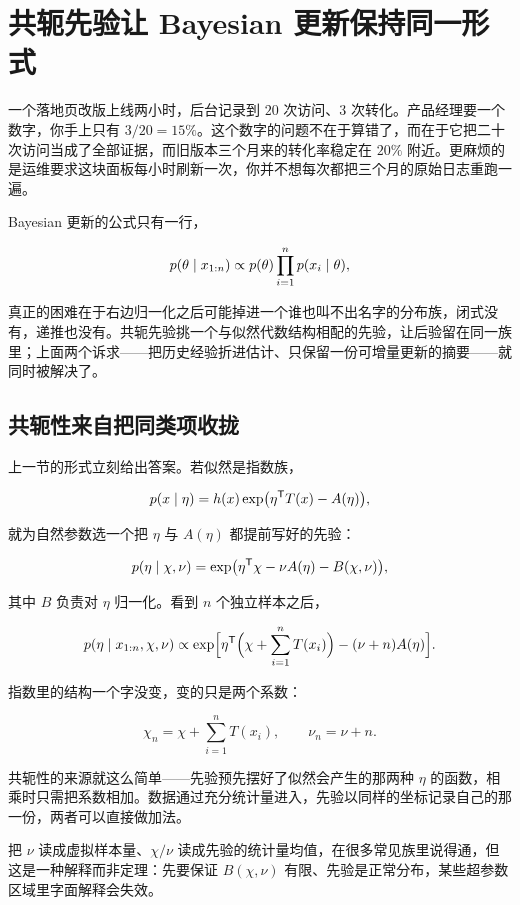 \section{共轭先验让 Bayesian 更新保持同一形式}
\label{sec:13-Machine-Learning/06-Probabilistic-Models/07}

一个落地页改版上线两小时，后台记录到 \(20\) 次访问、\(3\) 次转化。产品经理要一个数字，你手上只有 \(3/20=15\%\)。这个数字的问题不在于算错了，而在于它把二十次访问当成了全部证据，而旧版本三个月来的转化率稳定在 \(20\%\) 附近。更麻烦的是运维要求这块面板每小时刷新一次，你并不想每次都把三个月的原始日志重跑一遍。

Bayesian 更新的公式只有一行，

\[
p(\theta\mid x_{1:n})\propto p(\theta)\prod_{i=1}^np(x_i\mid\theta),
\]

真正的困难在于右边归一化之后可能掉进一个谁也叫不出名字的分布族，闭式没有，递推也没有。共轭先验挑一个与似然代数结构相配的先验，让后验留在同一族里；上面两个诉求——把历史经验折进估计、只保留一份可增量更新的摘要——就同时被解决了。

\subsection{共轭性来自把同类项收拢}

上一节的形式立刻给出答案。若似然是指数族，

\[
p(x\mid\eta)=h(x)\exp\bigl(\eta^{\mathsf{T}}T(x)-A(\eta)\bigr),
\]

就为自然参数选一个把 \(\eta\) 与 \(A(\eta)\) 都提前写好的先验：

\[
p(\eta\mid\chi,\nu)=\exp\bigl(\eta^{\mathsf{T}}\chi-\nu A(\eta)-B(\chi,\nu)\bigr),
\]

其中 \(B\) 负责对 \(\eta\) 归一化。看到 \(n\) 个独立样本之后，

\[
p(\eta\mid x_{1:n},\chi,\nu)
\propto\exp\Bigl[\eta^{\mathsf{T}}\Bigl(\chi+\sum_{i=1}^nT(x_i)\Bigr)-(\nu+n)A(\eta)\Bigr].
\]

指数里的结构一个字没变，变的只是两个系数：

\[
\chi_n=\chi+\sum_{i=1}^nT(x_i),\qquad \nu_n=\nu+n.
\]

共轭性的来源就这么简单——先验预先摆好了似然会产生的那两种 \(\eta\) 的函数，相乘时只需把系数相加。数据通过充分统计量进入，先验以同样的坐标记录自己的那一份，两者可以直接做加法。

把 \(\nu\) 读成虚拟样本量、\(\chi/\nu\) 读成先验的统计量均值，在很多常见族里说得通，但这是一种解释而非定理：先要保证 \(B(\chi,\nu)\) 有限、先验是正常分布，某些超参数区域里字面解释会失效。

